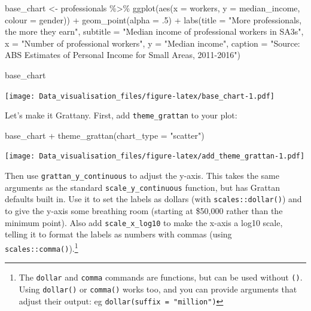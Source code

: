 \documentclass[
]{book}
\newenvironment{Shaded}{\begin{snugshade}}{\end{snugshade}}
\newcommand{\AttributeTok}[1]{\textcolor[rgb]{0.77,0.63,0.00}{#1}}
\newcommand{\DecValTok}[1]{\textcolor[rgb]{0.00,0.00,0.81}{#1}}
\newcommand{\FunctionTok}[1]{\textcolor[rgb]{0.00,0.00,0.00}{#1}}
\newcommand{\NormalTok}[1]{#1}
\newcommand{\OtherTok}[1]{\textcolor[rgb]{0.56,0.35,0.01}{#1}}
\newcommand{\SpecialCharTok}[1]{\textcolor[rgb]{0.00,0.00,0.00}{#1}}
\newcommand{\StringTok}[1]{\textcolor[rgb]{0.31,0.60,0.02}{#1}}
\begin{document}
\begin{Shaded}
\begin{Highlighting}[]
\NormalTok{base\_chart }\OtherTok{\textless{}{-}}\NormalTok{ professionals }\SpecialCharTok{\%\textgreater{}\%} 
        \FunctionTok{ggplot}\NormalTok{(}\FunctionTok{aes}\NormalTok{(}\AttributeTok{x =}\NormalTok{ workers,}
                   \AttributeTok{y =}\NormalTok{ median\_income,}
                   \AttributeTok{colour =}\NormalTok{ gender)) }\SpecialCharTok{+} 
        \FunctionTok{geom\_point}\NormalTok{(}\AttributeTok{alpha =}\NormalTok{ .}\DecValTok{5}\NormalTok{) }\SpecialCharTok{+} 
        \FunctionTok{labs}\NormalTok{(}\AttributeTok{title =} \StringTok{"More professionals, the more they earn"}\NormalTok{,}
             \AttributeTok{subtitle =} \StringTok{"Median income of professional workers in SA3s"}\NormalTok{,}
             \AttributeTok{x =} \StringTok{"Number of professional workers"}\NormalTok{,}
             \AttributeTok{y =} \StringTok{"Median income"}\NormalTok{,}
             \AttributeTok{caption =} \StringTok{"Source: ABS Estimates of Personal Income for Small Areas, 2011{-}2016"}\NormalTok{)}

\NormalTok{base\_chart}
\end{Highlighting}
\end{Shaded}

\texttt{[image: Data\_visualisation\_files/figure-latex/base\_chart-1.pdf]}

Let's make it Grattany. First, add \texttt{theme\_grattan} to your plot:

\begin{Shaded}
\begin{Highlighting}[]
\NormalTok{base\_chart }\SpecialCharTok{+}
        \FunctionTok{theme\_grattan}\NormalTok{(}\AttributeTok{chart\_type =} \StringTok{"scatter"}\NormalTok{)}
\end{Highlighting}
\end{Shaded}

\texttt{[image: Data\_visualisation\_files/figure-latex/add\_theme\_grattan-1.pdf]}

Then use \texttt{grattan\_y\_continuous} to adjust the y-axis. This takes the same arguments as the standard \texttt{scale\_y\_continuous} function, but has Grattan defaults built in. Use it to set the labels as dollars (with \texttt{scales::dollar()}) and to give the y-axis some breathing room (starting at \$50,000 rather than the minimum point).
Also add \texttt{scale\_x\_log10} to make the x-axis a log10 scale, telling it to format the labels as numbers with commas (using \texttt{scales::comma()}).\footnote{The \texttt{dollar} and \texttt{comma} commands are functions, but can be used without \texttt{()}. Using \texttt{dollar()} or \texttt{comma()} works too, and you can provide arguments that adjust their output: eg \texttt{dollar(suffix\ =\ "million")}}
\end{document}
